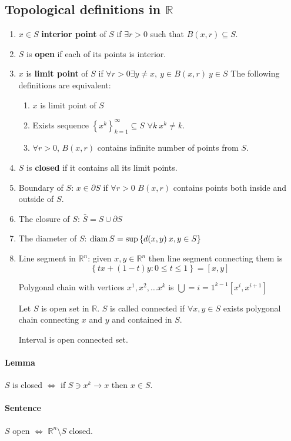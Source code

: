 \subsection{Topological definitions in $\mathbb{R}$}
\begin{enumerate}
	\item $x \in S$ \textbf{interior point} of $S$ if $\exists r > 0$ such that $B(x,r)\subseteq S$.
	\item $S$ is \textbf{open} if each of its points is interior. 
	\item $x$ is \textbf{limit point} of $S$ if $\forall r > 0 \exists y \neq x, \: y\in B(x,r) \: y \in S$ 
	The following definitions are equivalent:
	\begin{enumerate}
		\item $x$ is limit point of $S$
		\item Exists sequence $\left\{ x^k \right\}_{k=1}^\infty \subseteq S$ $\forall k\: x^k \neq k$.
		\item $\forall r > 0 $, $B(x,r)$ contains infinite number of points from $S$.
	\end{enumerate}
	\item $S$ is \textbf{closed} if it contains all its limit points.
	\item Boundary of $S$: $x \in \partial S$ if $\forall r>0$ $B(x,r)$ contains points both inside and outside of $S$.
	\item The closure of $S$: $\bar{S} = S \cup \partial S$ 
	\item The diameter of $S$: $\operatorname{diam} S = \sup\left\{ d(x,y) \: x,y\in S \right\}$
	\item Line segment in $\mathbb{R}^n$: given $x,y \in \mathbb{R}^n$ then line segment connecting them is $$\left\{tx+(1-t)y: 0 \leq t \leq 1\right\} = [x,y]$$
	
	Polygonal chain with vertices $x^1,x^2,\dots x^k$ is $\bigcup={i=1}^{k-1} \left[x^i, x^{i+1}\right]$
	
	Let $S$ is open set in $\mathbb{R}$. $S$ is called connected if $\forall x,y \in S$ exists polygonal chain connecting $x$ and $y$ and contained in $S$. 
	
	Interval is open connected set.
\end{enumerate}
\paragraph{Lemma}
$S$ is closed $\iff$ if $S \ni x^k \to x$ then $x\in S$.
\paragraph{Sentence} $S$ open $\iff$ $\mathbb{R}^n \setminus S$ closed.  
